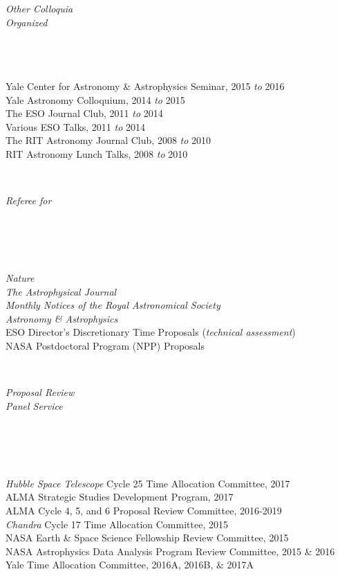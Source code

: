 \documentclass[11pt]{article}
\begin{document}
\hspace{2.5mm} \parbox{1.5in}{{\it Other Colloquia \\ Organized \\\\\\\\} } \parbox{5.15in}{Yale Center for Astronomy \& Astrophysics Seminar, 2015 {\it to} 2016 \\ Yale Astronomy Colloquium, 2014 {\it to} 2015 \\ The ESO Journal Club, 2011 {\it to} 2014 \\ Various ESO Talks, 2011 {\it to} 2014 \\ The RIT Astronomy Journal Club, 2008 {\it to} 2010 \\ RIT Astronomy Lunch Talks, 2008 {\it to} 2010 }\\


\vspace{4mm}


\hspace{2.5mm} \parbox{1.5in}{{\it Referee for \\\\\\\\\\}} \parbox{5.15in}{
{\it Nature}\\ 
{\it The Astrophysical Journal}\\  
{\it Monthly Notices of the Royal Astronomical Society}\\
{\it Astronomy \& Astrophysics}\\
ESO Director's Discretionary Time Proposals ({\it technical assessment}) \\
NASA Postdoctoral Program (NPP) Proposals} \\


\vspace{4mm}


\hspace{2.5mm} \parbox{1.5in}{{\it Proposal Review \\ Panel Service \\\\\\\\\\}} \parbox{5.15in}{ 
\textit{Hubble Space Telescope} Cycle 25 Time Allocation Committee, 2017 \\
ALMA Strategic Studies Development Program, 2017 \\
ALMA Cycle 4, 5, and 6 Proposal Review Committee, 2016-2019 \\{\it Chandra} Cycle 17 Time Allocation Committee, 2015  \\ NASA Earth \& Space Science Fellowship Review Committee, 2015 \\
NASA Astrophysics Data Analysis Program Review Committee, 2015 \& 2016 \\
Yale Time Allocation Committee, 2016A, 2016B, \& 2017A} \\
\end{document}
